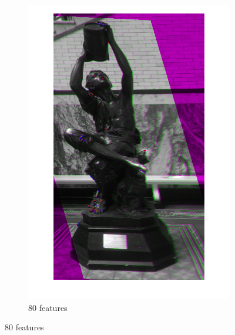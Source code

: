 \documentclass[sigconf]{acmart/acmart}
\begin{document}
\begin{figure}[h]
\begin{subfigure}[b]{0.3\textwidth}
		\includegraphics[width=\textwidth]{figures/alignment/fused_80_features_16_iterations}
		\caption{80 features}
	\end{subfigure}


\end{figure}
\end{document}
